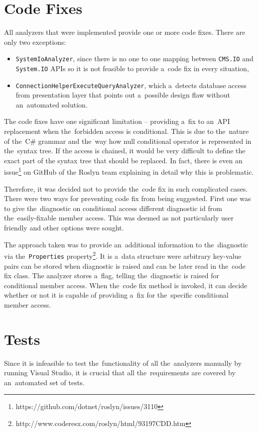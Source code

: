 \documentclass[
  digital, %
  table,   %
  lof,     %
  lot,     %
  oneside,
]{fithesis3}
\begin{document}
\section{Code Fixes}
\label{sec:code-fixes}
All analyzers that were implemented provide one or more code fixes. There are only two exceptions:
\begin{itemize}
  \item \texttt{SystemIoAnalyzer}, since there is no one to one mapping between \texttt{CMS.IO} and \texttt{System.IO} APIs so it is not feasible to provide a~code fix in every situation,
  \item \texttt{ConnectionHelperExecuteQueryAnalyzer}, which a~detects database access from presentation layer that points out a~possible design flaw without an~automated solution.
\end{itemize} 

The code fixes have one significant limitation -- providing a~fix to an~API replacement when the~forbidden access is conditional. This is due to the~nature of the~C\# grammar and the~way how null conditional operator is represented in the~syntax tree. If the access is chained, it would be very difficult to define the exact part of the syntax tree that should be replaced. In fact, there is even an issue\footnote{https://github.com/dotnet/roslyn/issues/3110} on GitHub of the Roslyn team explaining in detail why this is problematic. 

Therefore, it was decided not to provide the~code fix in such complicated cases. There were two ways for preventing code fix from being suggested. First one was to give the~diagnostic on conditional access different diagnostic id from the~easily-fixable member access. This was deemed as not particularly user friendly and other options were sought.

The approach taken was to provide an~additional information to the~diagnostic via the~\texttt{Properties} property\footnote{http://www.coderesx.com/roslyn/html/93197CDD.htm}. It is a~data structure were arbitrary key-value pairs can be stored when diagnostic is raised and can be later read in the~code fix class. The analyzer stores a~flag, telling the~diagnostic is raised for conditional member access. When the~code fix method is invoked, it can decide whether or not it is capable of providing a~fix for the~specific conditional member access.

\section{Tests}
Since it is infeasible to test the~functionality of all the~analyzers manually by running Visual Studio, it is crucial that all the~requirements are covered by an~automated set of tests. 
\end{document}
